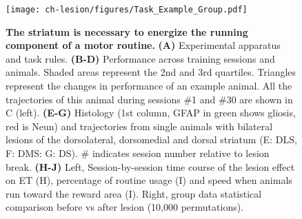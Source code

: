 \begin{figure}[bth!]
 \begin{center}
	\texttt{[image: ch-lesion/figures/Task\_Example\_Group.pdf]}
	\caption
	{\textbf{The striatum is necessary to energize the running component of a motor routine.}
	\textbf{(A)} Experimental apparatus and task rules.
	\textbf{(B-D)} Performance across training sessions and animals.
	Shaded areas represent the 2nd and 3rd quartiles. Triangles represent the changes in performance of an example animal. 
	All the trajectories of this animal during sessions \#1 and \#30 are shown in C (left). 
	\textbf{(E-G)} Histology (1st column, GFAP in green shows gliosis, red is Neun) and trajectories from single animals with bilateral lesions of the dorsolateral, dorsomedial and dorsal striatum (E: DLS, F: DMS: G: DS).
	\# indicates session number relative to lesion break.
	\textbf{(H-J)} Left, Session-by-session time course of the lesion effect on ET (H), percentage of routine usage (I) and speed when animals run toward the reward area (I).
	Right, group data statistical comparison before vs after lesion (10,000 permutations).
	}
	\label{fig:lesion:task}
 \end{center}
\end{figure}